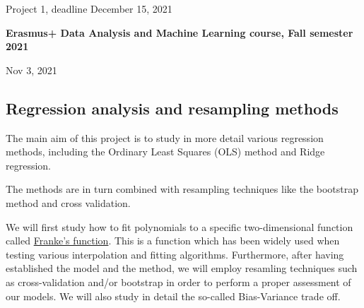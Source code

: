 \documentclass[%
oneside,                 %
final,                   %
10pt]{article}
\begin{document}

\newcommand{\exercisesection}[1]{\subsection*{#1}}






\thispagestyle{empty}

\begin{center}
{\LARGE\bf
\begin{spacing}{1.25}
Project 1, deadline December 15, 2021
\end{spacing}
}
\end{center}


\begin{center}
{\bf Erasmus+ Data Analysis and Machine Learning course, Fall semester 2021${}^{}$} \\ [0mm]
\end{center}

\begin{center}
\end{center}
    

\begin{center}
Nov 3, 2021
\end{center}

\vspace{1cm}


\subsection{Regression analysis and resampling methods}

The main aim of this project is to study in more detail various
regression methods, including the Ordinary Least Squares (OLS) method and Ridge regression.

The methods are in turn combined with resampling techniques like the bootstrap method and cross validation. 

We will first study how to fit polynomials to a specific
two-dimensional function called \href{{http://www.dtic.mil/dtic/tr/fulltext/u2/a081688.pdf}}{Franke's
function}.  This
is a function which has been widely used when testing various
interpolation and fitting algorithms. Furthermore, after having
established the model and the method, we will employ resamling
techniques such as cross-validation and/or bootstrap in order to perform a
proper assessment of our models. We will also study in detail the
so-called Bias-Variance trade off.
\end{document}
